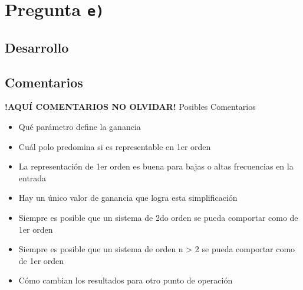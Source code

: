 \section{Pregunta \texttt{e)}}\label{pregunta-e}

\subsection{Desarrollo}



\FloatBarrier
\subsection{Comentarios}


\textbf{!AQUÍ COMENTARIOS NO OLVIDAR!}
Posibles Comentarios
\begin{itemize}
    \item Qué parámetro define la ganancia
    \item Cuál polo predomina si es representable en 1er orden
    \item La representación de 1er orden es buena para bajas o altas frecuencias en la entrada
    \item Hay un único valor de ganancia que logra esta simplificación
    \item Siempre es posible que un sistema de 2do orden se pueda comportar como de 1er orden
    \item Siempre es posible que un sistema de orden n > 2 se pueda comportar como de 1er orden
    \item Cómo cambian los resultados para otro punto de operación
\end{itemize}